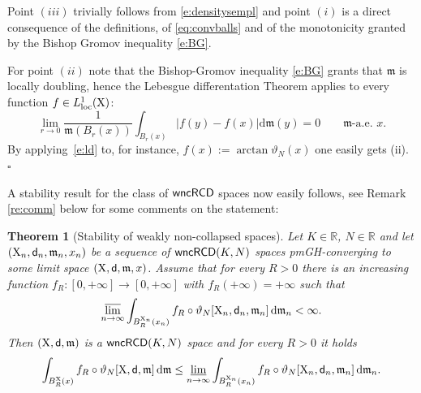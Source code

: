 \documentclass[reqno,11pt]{article}
\numberwithin{equation}{section}
\newcommand{\R}{\mathbb{R}}
\newcommand{\mm}{{\mbox{\boldmath$m$}}}
\newcommand{\sfd}{{\sf d}}
\renewcommand{\d}{{\mathrm d}}
\newcommand{\limi}{\varliminf}
\newcommand{\lims}{\varlimsup}
\renewcommand{\mm}{\mathfrak m}                                %
\renewenvironment{proof}{\removelastskip\par\medskip   %
\noindent{\em Proof} \rm}{\penalty-20\null\hfill$\square$\par\medbreak}
\newtheorem{theorem}{Theorem}[section]
\newcommand{\X}{{\rm X}}
\newcommand{\wncRCD}{{\sf wncRCD}}
\begin{document}
\begin{proof} Point $(iii)$ trivially follows from \eqref{e:densitysempl}  and point $(i)$ is a direct consequence of the definitions, of \eqref{eq:convballs} and of the monotonicity granted by the   Bishop Gromov inequality \eqref{e:BG}. 

For point $(ii)$ note that the Bishop-Gromov inequality \eqref{e:BG} grants that \(\mm\) is locally doubling, hence  the Lebesgue differentation Theorem applies to every function \(f\in L^1_{\rm loc}(\X)\):
\begin{equation}\label{e:ld}
\lim_{r\to 0} \frac{1}{\mm(B_r(x))}\int_{B_{r}(x)}|f(y)-f(x)|\d \mm(y)=0\qquad\text{\(\mm\)-a.e. \(x\)}.
\end{equation}
By applying~\eqref{e:ld} to, for instance, \(f(x):=\arctan \vartheta_N(x)\) one easily gets (ii).
\end{proof}
A stability result for the class of $\wncRCD$ spaces now easily follows, see Remark \ref{re:comm} below for some comments on the statement:
\begin{theorem}[Stability of weakly non-collapsed spaces]\label{thm:stabweak}
Let $K\in\R$, $N\in\R$ and let \linebreak $(\X_n,\sfd_n,\mm_n,x_n)$ be a sequence of  $\wncRCD(K,N)$ spaces pmGH-converging to some limit space $(\X,\sfd,\mm,x)$. Assume that for every $R>0$ there is an increasing function $f_R:[0,+\infty]\to[0,+\infty]$ with $f_R(+\infty)=+\infty$ such that
\begin{equation}
\label{eq:lims}
\lims_{n\to\infty}\int_{B^{\X_n}_R(x_n)}f_R\circ\vartheta_N[\X_n,\sfd_n,\mm_n]\,\d\mm_n<\infty.
\end{equation}
Then $(\X,\sfd,\mm)$ is a $\wncRCD(K,N)$ space and for every $R>0$ it holds
\begin{equation}
\label{eq:fatou}
\int_{B^\X_R(x)}f_R\circ\vartheta_N[\X,\sfd,\mm]\,\d\mm\leq\limi_{n\to\infty} \int_{B^{\X_n}_R(x_n)}f_R\circ\vartheta_N[\X_n,\sfd_n,\mm_n]\,\d\mm_n.
\end{equation}
\end{theorem}
\end{document}
